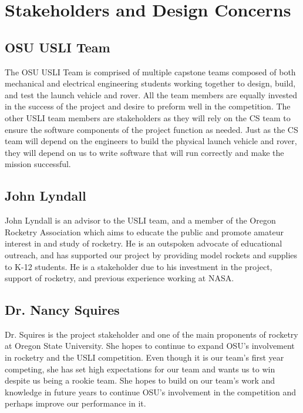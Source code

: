 \documentclass[onecolumn, draftclsnofoot,10pt, compsoc]{IEEEtran}
\begin{document}
\section{Stakeholders and Design Concerns}
\subsection{OSU USLI Team}
The OSU USLI Team is comprised of multiple capstone teams composed of both mechanical and electrical engineering students working together to design, build, and test the launch vehicle and rover. All the team members are equally invested in the success of the project and desire to preform well in the competition. The other USLI team members are stakeholders as they will rely on the CS team to ensure the software components of the project function as needed. Just as the CS team will depend on the engineers to build the physical launch vehicle and rover, they will depend on us to write software that will run correctly and make the mission successful.
\subsection{John Lyndall}
John Lyndall is an advisor to the USLI team, and a member of the Oregon Rocketry Association which aims to educate the public and promote amateur interest in and study of rocketry. He is an outspoken advocate of educational outreach, and has supported our project by providing model rockets and supplies to K-12 students. He is a stakeholder due to his investment in the project, support of rocketry, and previous experience working at NASA. 
\subsection{Dr. Nancy Squires}
Dr. Squires is the project stakeholder and one of the main proponents of rocketry at Oregon State University. She hopes to continue to expand OSU's involvement in rocketry and the USLI competition. Even  though it is our team's first year competing, she has set high expectations for our team and wants us to win despite us being a rookie team. She hopes to build on our team's work and knowledge in future years to continue OSU's involvement in the competition and perhaps improve our performance in it.
\end{document}
